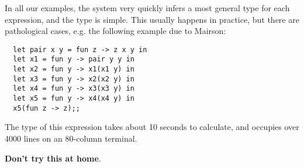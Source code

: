 \begin{slide*}


\vspace*{0.5cm}

In all our examples, the system very quickly infers a most general type for
each expression, and the type is simple. This usually happens in practice, but
there are pathological cases, e.g. the following example due to Mairson:

\begin{black}
\begin{verbatim}
  let pair x y = fun z -> z x y in
  let x1 = fun y -> pair y y in
  let x2 = fun y -> x1(x1 y) in
  let x3 = fun y -> x2(x2 y) in
  let x4 = fun y -> x3(x3 y) in
  let x5 = fun y -> x4(x4 y) in
  x5(fun z -> z);;
\end{verbatim}
\end{black}

The type of this expression takes about 10 seconds to calculate, and occupies
over 4000 lines on an 80-column terminal.

{\bf Don't try this at home}.

\end{slide*}



